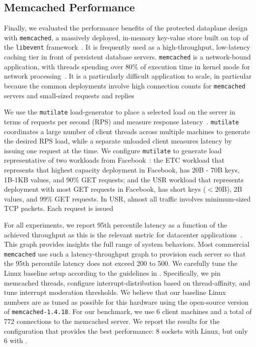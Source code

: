 
\subsection{Memcached Performance}
\label{sec:eval:memcached}




Finally, we evaluated the performance benefits of the \ix protected
dataplane design with \texttt{memcached}, a massively deployed,
in-memory key-value store built on top of the \texttt{libevent}
framework~\cite{url:memcached}. It is frequently used as a
high-throughput, low-latency caching tier in front of persistent
database servers. \texttt{memcached} is a network-bound
application, with threads spending over 80\% of execution time in
kernel mode for network processing~\cite{Leverich:RHSU:2014}. It is a
particularly difficult application to scale, in particular because the
common deployments involve high connection counts for
\texttt{memcached} servers and small-sized requests and
replies~\cite{nishtala2013scaling,Atikoglu:2012:WAL}

We use the \texttt{mutilate} load-generator to place a selected load
on the server in terms of requests per second (RPS) and measure
response latency~\cite{url:mutilate}. \texttt{mutilate} coordinates a
large number of client threads across multiple machines to generate
the desired RPS load, while a separate unloaded client measures
latency by issuing one request at the time.  We configure
\texttt{mutilate} to generate load representative of two workloads
from Facebook~\cite{Atikoglu:2012:WAL}: the ETC workload that
represents that highest capacity deployment in Facebook, has 20B - 70B
keys, 1B-1KB values, and 90\% GET requests; and the USR workload that
represents deployment with most GET requests in Facebook, has short
keys ($<$20B), 2B values, and 99\% GET requests. In USR, almost all
traffic involves minimum-sized TCP packets. Each request is issued 

For all experiments, we report 95th percentile latency as a function
of the achieved throughput as this is the relevant metric for
datacenter
applications\microsecond~\cite{DBLP:journals/cacm/DeanB13}. This graph
provides insights the full range of system behaviors. Most commercial
\texttt{memcached} use such a latency-throughput graph to provision
each server so that the 95th percentile latency does not exceed 200 to
500.  We carefully tune the Linux baseline setup according to the
guidelines in \cite{Leverich:RHSU:2014}. Specifically, we pin
memcached threads, configure interrupt-distribution based on
thread-affinity, and tune interrupt moderation thresholds. We believe
that our baseline Linux numbers are as tuned as possible for this
hardware using the open-source version of
\texttt{memcached-1.4.18}. For our benchmark, we use 6 client machines
and a total of 772 connections to the memcached server. We report the
results for the configuration that provides the best performance: 
8 sockets with Linux, but only 6 with \ix.

